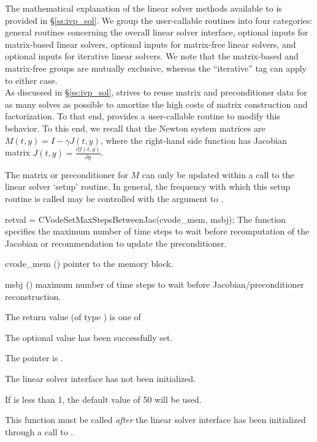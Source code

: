 The mathematical explanation of the linear solver methods
available to {\cvode} is provided in \S\ref{ss:ivp_sol}.  We
group the user-callable routines into four categories: general
routines concerning the overall {\cvls} linear solver interface,
optional inputs for matrix-based linear solvers, optional inputs for
matrix-free linear solvers, and optional inputs for iterative linear
solvers.  We note that the matrix-based and matrix-free groups are
mutually exclusive, whereas the ``iterative'' tag can apply to either
case. \\


As discussed in \S\ref{ss:ivp_sol}, {\cvode} strives to reuse matrix
and preconditioner data for as many solves as possible to amortize the
high costs of matrix construction and factorization.  To that end,
{\cvode} provides a user-callable routine to modify this behavior.  To
this end, we recall that the Newton system matrices are $M(t,y) = I -
\gamma J(t,y)$, where the right-hand side function has Jacobian matrix
$J(t,y) = \frac{\partial f(t,y)}{\partial y}$.

The matrix or preconditioner for $M$ can only be updated within a call
to the linear solver `setup' routine.  In general, the frequency with
which this setup routine is called may be controlled with the
 argument to .

{
  retval = CVodeSetMaxStepsBetweenJac(cvode\_mem, msbj);
}
{
  The function  specifies the maximum
  number of time steps to wait before recomputation of the Jacobian or
  recommendation to update the preconditioner.
}
{
  \begin{args}
  \item[cvode\_mem] ()
    pointer to the {\cvode} memory block.
  \item[msbj] ()
    maximum number of time steps to wait before
    Jacobian/preconditioner reconstruction.
  \end{args}
}
{
  The return value  (of type ) is one of
  \begin{args}
  \item[\Id{CVLS\_SUCCESS}]
    The optional value has been successfully set.
  \item[\Id{CVLS\_MEM\_NULL}]
    The  pointer is .
  \item[\Id{CVLS\_LMEM\_NULL}]
    The {\cvls} linear solver interface has not been initialized.
  \end{args}
}
{
  If  is less than 1, the default value of 50 will be used.

  This function must be called \emph{after} the {\cvls} linear solver
  interface has been initialized through a call to
  .
}


